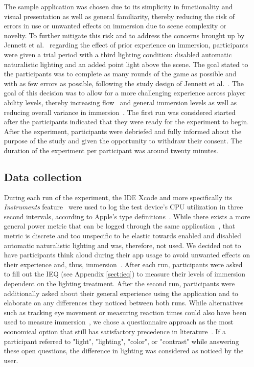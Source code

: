 \documentclass[12pt,twoside,english]{article}
\begin{document}
The sample application was chosen due to its simplicity in functionality and visual presentation as well as general familiarity, thereby reducing the risk of errors in use or unwanted effects on immersion due to scene complexity or novelty.
To further mitigate this risk and to address the concerns brought up by Jennett et al.~\cite{jennett_measuring_2008} regarding the effect of prior experience on immersion, participants were given a trial period with a third lighting condition: disabled automatic naturalistic lighting and an added point light above the scene.
The goal stated to the participants was to complete as many rounds of the game as possible and with as few errors as possible, following the study design of Jennett et al.~\cite{jennett_measuring_2008}.
The goal of this decision was to allow for a more challenging experience across player ability levels, thereby increasing flow~\cite{csikszentmihalyi_flow_1990} and general immersion levels as well as reducing overall variance in immersion~\cite{jennett_measuring_2008}.
The first run was considered started after the participants indicated that they were ready for the experiment to begin.
After the experiment, participants were debriefed and fully informed about the purpose of the study and given the opportunity to withdraw their consent.
The duration of the experiment per participant was around twenty minutes.

\subsection{Data collection}
\label{sect:data_collection}

During each run of the experiment, the \gls{IDE} Xcode and more specifically its \textit{Instruments} feature~\cite{apple_xcode_2020} were used to log the test device's \gls{CPU} utilization in three second intervals, according to Apple's type definitions~\cite{apple_system_2020}.
While there exists a more general power metric that can be logged through the same application~\cite{apple_energy_2020-1}, that metric is discrete and too unspecific to be elastic towards enabled and disabled automatic naturalistic lighting and was, therefore, not used.
We decided not to have participants think aloud during their app usage to avoid unwanted effects on their experience and, thus, immersion~\cite{van_den_haak_retrospective_2003}.
After each run, participants were asked to fill out the \gls{IEQ} (see Appendix \ref{sect:ieq}) to measure their levels of immersion dependent on the lighting treatment.
After the second run, participants were additionally asked about their general experience using the application and to elaborate on any differences they noticed between both runs.
While alternatives such as tracking eye movement or measuring reaction times could also have been used to measure immersion~\cite{jennett_measuring_2008}, we chose a questionnaire approach as the most economical option that still has satisfactory precedence in literature~\cite{boyle_engagement_2012}.
If a participant referred to "light", "lighting", "color", or "contrast" while answering these open questions, the difference in lighting was considered as noticed by the user.
\end{document}
